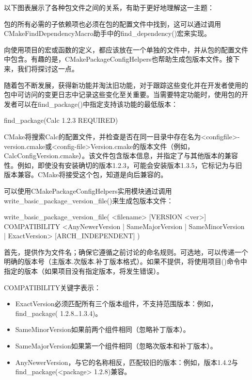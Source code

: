 以下图表展示了各种包文件之间的关系，有助于更好地理解这一主题：


包的所有必需的子依赖项也必须在包的配置文件中找到，这可以通过调用CMakeFindDependencyMacro助手中的find\_dependency()宏来实现。

向使用项目的宏或函数的定义，都应该放在一个单独的文件中，并从包的配置文件中包含。有趣的是，CMakePackageConfigHelpers也帮助生成包版本文件。接下来，我们将探讨这一点。


随着包不断发展，获得新功能并淘汰旧功能，对于跟踪这些变化并在开发者使用的包中可访问的变更日志中记录这些变化至关重要。当需要特定功能时，使用包的开发者可以在find\_package()中指定支持该功能的最低版本：

\begin{cmake}
find_package(Calc 1.2.3 REQUIRED)
\end{cmake}

CMake将搜索Calc的配置文件，并检查是否在同一目录中存在名为<configfile>-version.cmake或<config-file>Version.cmake的版本文件（例如，CalcConfigVersion.cmake）。该文件包含版本信息，并指定了与其他版本的兼容性。例如，即使没有安装确切的版本1.2.3，可能会安装版本1.3.5，它标记为与旧版本兼容。CMake将接受这个包，知道是向后兼容的。

可以使用CMakePackageConfigHelpers实用模块通过调用write\_basic\_package\_version\_file()来生成包版本文件：

\begin{shell}
write_basic_package_version_file(
    <filename> [VERSION <ver>]
    COMPATIBILITY <AnyNewerVersion | SameMajorVersion |
    SameMinorVersion | ExactVersion>
    [ARCH_INDEPENDENT]
)
\end{shell}

首先，提供作为文件名；确保它遵循之前讨论的命名规则。可选地，可以传递一个明确的版本号（主版本.次版本.补丁版本格式）。如果不提供，将使用项目()命令中指定的版本（如果项目没有指定版本，将发生错误）。

COMPATIBILITY关键字表示：

\begin{itemize}
\item
ExactVersion必须匹配所有三个版本组件，不支持范围版本：例如，find\_package( 1.2.8…1.3.4)。

\item
SameMinorVersion如果前两个组件相同（忽略补丁版本）。

\item
SameMajorVersion如果第一个组件相同（忽略次版本和补丁版本）。

\item
AnyNewerVersion，与它的名称相反，匹配较旧的版本：例如，版本1.4.2与find\_package(<package> 1.2.8)兼容。
\end{itemize}

